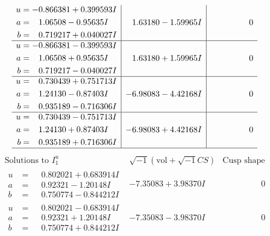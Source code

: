 \documentclass[1p]{elsarticle_modified}
\theoremstyle{definition}
\newcommand{\I}{\sqrt{-1}}
\begin{document}
$$\begin{array}{c|c|c}
\begin{aligned}
u &= -0.866381 + 0.399593 I \\
a &= \phantom{-}1.06508 - 0.95635 I \\
b &= \phantom{-}0.719217 + 0.040027 I\end{aligned}
 & \phantom{-}1.63180 - 1.59965 I & \phantom{-0.000000 } 0 \\ \hline\begin{aligned}
u &= -0.866381 - 0.399593 I \\
a &= \phantom{-}1.06508 + 0.95635 I \\
b &= \phantom{-}0.719217 - 0.040027 I\end{aligned}
 & \phantom{-}1.63180 + 1.59965 I & \phantom{-0.000000 } 0 \\ \hline\begin{aligned}
u &= \phantom{-}0.730439 + 0.751713 I \\
a &= \phantom{-}1.24130 - 0.87403 I \\
b &= \phantom{-}0.935189 - 0.716306 I\end{aligned}
 & -6.98083 - 4.42168 I & \phantom{-0.000000 } 0 \\ \hline\begin{aligned}
u &= \phantom{-}0.730439 - 0.751713 I \\
a &= \phantom{-}1.24130 + 0.87403 I \\
b &= \phantom{-}0.935189 + 0.716306 I\end{aligned}
 & -6.98083 + 4.42168 I & \phantom{-0.000000 } 0\\
 \hline 
 \end{array}$$\newpage$$\begin{array}{c|c|c}  
\text{Solutions to }I^u_{1}& \I (\text{vol} + \sqrt{-1}CS) & \text{Cusp shape}\\
 \hline 
\begin{aligned}
u &= \phantom{-}0.802021 + 0.683914 I \\
a &= \phantom{-}0.92321 - 1.20148 I \\
b &= \phantom{-}0.750774 - 0.844212 I\end{aligned}
 & -7.35083 + 3.98370 I & \phantom{-0.000000 } 0 \\ \hline\begin{aligned}
u &= \phantom{-}0.802021 - 0.683914 I \\
a &= \phantom{-}0.92321 + 1.20148 I \\
b &= \phantom{-}0.750774 + 0.844212 I\end{aligned}
 & -7.35083 - 3.98370 I & \phantom{-0.000000 } 0 \\ \hline\begin{aligned}

\end{aligned}
\end{array}$$
\end{document}
